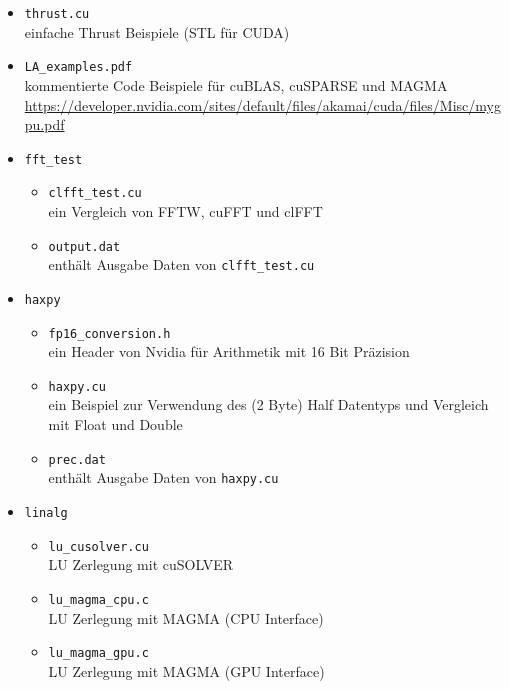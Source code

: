 \documentclass[headsepline=3pt,headinclude=true,12pt,oneside]{scrartcl}
\let\li=\lstinline
\begin{document}
\begin{itemize}
\begin{itemize}
			\item \li`thrust.cu` \\
			einfache Thrust Beispiele (STL für CUDA)			
			
			\item \li`LA_examples.pdf` \\ 
			kommentierte Code Beispiele für cuBLAS, cuSPARSE und MAGMA \\
			\url{https://developer.nvidia.com/sites/default/files/akamai/cuda/files/Misc/mygpu.pdf}
\newpage			
			\item \li`fft_test` 
			\begin{itemize}
				\item \li`clfft_test.cu` \\
				ein Vergleich von FFTW, cuFFT und clFFT				
				
				\item \li`output.dat` \\
				enthält Ausgabe Daten von \li`clfft_test.cu`
			\end{itemize}
			
			\item \li`haxpy`
			\begin{itemize}
				\item \li`fp16_conversion.h` \\
				ein Header von Nvidia für Arithmetik mit 16 Bit Präzision
				
				\item \li`haxpy.cu` \\
				ein Beispiel zur Verwendung des (2 Byte) Half Datentyps und Vergleich mit Float und Double
				
				\item \li`prec.dat` \\
				enthält Ausgabe Daten von \li`haxpy.cu`
			\end{itemize}
			
			\item \li`linalg`
			\begin{itemize}
				\item \li`lu_cusolver.cu` \\
				LU Zerlegung mit cuSOLVER
				
				\item \li`lu_magma_cpu.c` \\
				LU Zerlegung mit MAGMA (CPU Interface)
				 
				\item \li`lu_magma_gpu.c` \\
				LU Zerlegung mit MAGMA (GPU Interface)
				

\end{itemize}
\end{itemize}
\end{itemize}
\end{document}
